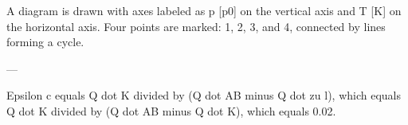 A diagram is drawn with axes labeled as p [p0] on the vertical axis and T [K] on the horizontal axis. Four points are marked: 1, 2, 3, and 4, connected by lines forming a cycle.

---

Epsilon c equals Q dot K divided by (Q dot AB minus Q dot zu l), which equals Q dot K divided by (Q dot AB minus Q dot K), which equals 0.02.